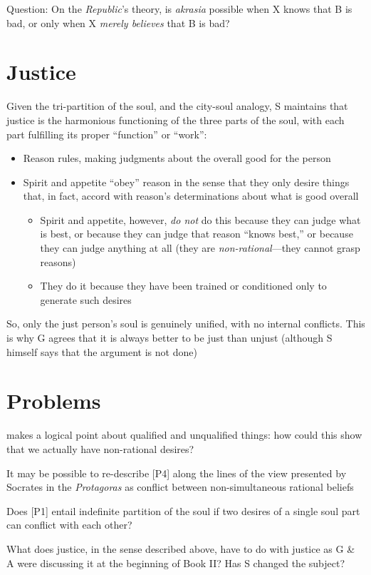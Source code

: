 \documentclass[11pt]{article}
\begin{document}
\noindent Question: On the \emph{Republic}'s theory, is \emph{akrasia} possible when X knows that B is bad, or only when X \emph{merely believes} that B is bad?

\section*{Justice}

\noindent Given the tri-partition of the soul, and the city-soul analogy, S maintains that justice is the harmonious functioning of the three parts of the soul, with each part fulfilling its proper ``function'' or ``work'': 

\begin{itemize}\item{Reason rules, making judgments about the overall good for the person}\item{Spirit and appetite ``obey'' reason in the sense that they only desire things that, in fact, accord with reason's determinations about what is good overall}\begin{itemize}\item{Spirit and appetite, however, \emph{do not} do this because they can judge what is best, or because they can judge that reason ``knows best,'' or because they can judge anything at all (they are \emph{non-rational}---they cannot grasp reasons)}\item{They do it because they have been trained or conditioned only to generate such desires}\end{itemize}\end{itemize}

\noindent So, only the just person's soul is genuinely unified, with no internal conflicts. This is why G agrees that it is always better to be just than unjust (although S himself says that the argument is not done)

\section*{Problems}

\noindent [P3] makes a logical point about qualified and unqualified things: how could this show that we actually have non-rational desires?
\vspace*{2mm}

\noindent It may be possible to re-describe [P4] along the lines of the view presented by Socrates in the \emph{Protagoras} as conflict between non-simultaneous rational beliefs
\vspace*{2mm}

\noindent Does [P1] entail indefinite partition of the soul if two desires of a single soul part can conflict with each other?
\vspace*{1mm}

\noindent What does justice, in the sense described above, have to do with justice as G \& A were discussing it at the beginning of Book II? Has S changed the subject?
\end{document}
